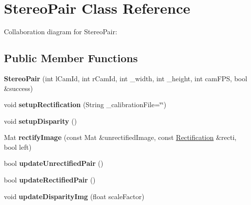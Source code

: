 \hypertarget{class_stereo_pair}{}\section{Stereo\+Pair Class Reference}
\label{class_stereo_pair}


Collaboration diagram for Stereo\+Pair\+:
\subsection*{Public Member Functions}
\begin{DoxyCompactItemize}
\item 
{\bfseries Stereo\+Pair} (int l\+Cam\+Id, int r\+Cam\+Id, int \+\_\+width, int \+\_\+height, int cam\+F\+PS, bool \&success)\hypertarget{class_stereo_pair_a8c6b4590df17e12dcafbedbba8f22544}{}\label{class_stereo_pair_a8c6b4590df17e12dcafbedbba8f22544}

\item 
void {\bfseries setup\+Rectification} (String \+\_\+calibration\+File=\char`\"{}\char`\"{})\hypertarget{class_stereo_pair_acb2644db7aab588154932a637ed12ed2}{}\label{class_stereo_pair_acb2644db7aab588154932a637ed12ed2}

\item 
void {\bfseries setup\+Disparity} ()\hypertarget{class_stereo_pair_ae4c51a1d8e9418ace715773931f160db}{}\label{class_stereo_pair_ae4c51a1d8e9418ace715773931f160db}

\item 
Mat {\bfseries rectify\+Image} (const Mat \&unrectified\+Image, const \hyperlink{struct_rectification}{Rectification} \&recti, bool left)\hypertarget{class_stereo_pair_a6d978b1624cbc7cc553fb0609e7b3f3f}{}\label{class_stereo_pair_a6d978b1624cbc7cc553fb0609e7b3f3f}

\item 
bool {\bfseries update\+Unrectified\+Pair} ()\hypertarget{class_stereo_pair_a90967c30e7a476982632f708e98918eb}{}\label{class_stereo_pair_a90967c30e7a476982632f708e98918eb}

\item 
bool {\bfseries update\+Rectified\+Pair} ()\hypertarget{class_stereo_pair_a9cce47872dc98058f28fafeab786ae7e}{}\label{class_stereo_pair_a9cce47872dc98058f28fafeab786ae7e}

\item 
void {\bfseries update\+Disparity\+Img} (float scale\+Factor)\hypertarget{class_stereo_pair_a92273e466d6279f57569aa25439abedb}{}\label{class_stereo_pair_a92273e466d6279f57569aa25439abedb}


\end{DoxyCompactItemize}
